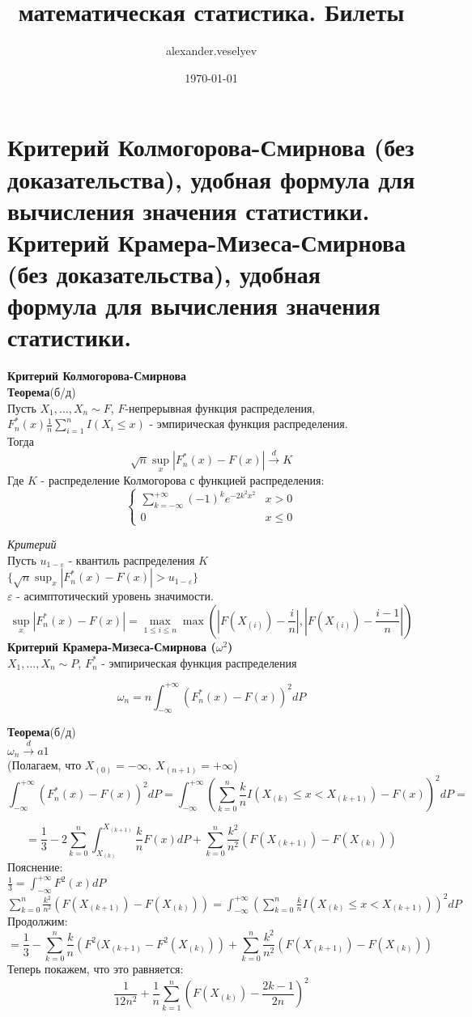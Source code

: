 \documentclass{article}
\title{математическая статистика. Билеты}
\author{alexander.veselyev }
\date{\today}
\begin{document}
\section{Критерий Колмогорова-Смирнова (без доказательства), удобная формула для вычисления значения статистики. Критерий Крамера-Мизеса-Смирнова (без доказательства), удобная формула для вычисления значения статистики.}

\textbf{Критерий Колмогорова-Смирнова}\\
\textbf{Теорема}(б/д)\\
Пусть $X_1,\dots,X_n\sim F$, $F$-непрерывная функция распределения,\\
$F_n^*(x)\frac{1}{n}\sum_{i=1}^nI(X_i\leq x)$ - эмпирическая функция распределения.\\
Тогда
$$ \sqrt{n}\sup_x|F_n^*(x) - F(x)|\xrightarrow{d}K $$
Где $K$ - распределение Колмогорова с функцией распределения:
\begin{equation*}
	\begin{cases}
		\sum_{k=-\infty}^{+\infty}{(-1)^ke^{-2k^2x^2}}&x>0\\
		0&x\leq0
	\end{cases}
\end{equation*}

\textit{Критерий}\\
Пусть $u_{1-\varepsilon}$ - квантиль распределения $K$\\
$\{\sqrt{n}\sup_x|F_n^*(x) - F(x)| > u_{1-\varepsilon}\}$\\
$\varepsilon$ - асимптотический уровень значимости.\\
$$ \sup_x|F_n^*(x) - F(x)| = \max_{1\leq i\leq n}\max(|F(X_{(i)}) - \frac{i}{n}|, |F(X_{(i)}) - \frac{i-1}{n}|) $$
\textbf{Критерий Крамера-Мизеса-Смирнова ($\omega^2$)}\\
$X_1,\dots,X_n\sim P$, $F_n^*$ - эмпирическая функция распределения

$$\omega_n = n\int_{-\infty}^{+\infty}{(F_n^*(x) - F(x))^2dP} $$

\textbf{Теорема}(б/д)\\
$\omega_n\xrightarrow{d}a1$\\
(Полагаем, что $X_{(0)} = -\infty,\ X_{(n+1)}= +\infty$)\\
$$\int_{-\infty}^{+\infty}{(F_n^*(x) - F(x))^2dP} = \int_{-\infty}^{+\infty}{\left(\sum_{k=0}^n{\frac{k}{n}I(X_{(k)}\leq x < X_{(k+1)})} - F(x)\right)^2dP} = $$

$$ = \frac{1}{3} - 2\sum_{k=0}^n{\int_{X_{(k)}}^{X_{(k+1)}} \frac{k}{n} F(x)dP  }  + \sum_{k=0}^n{ \frac{k^2}{n^2} \left(  F(X_{(k+1)}) - F(X_{(k)}) \right) }$$
Пояснение:\\
$\frac{1}{3} = \int_{-\infty}^{+\infty}{F^2(x)dP}$\\
$\sum_{k=0}^n{ \frac{k^2}{n^2} \left(  F(X_{(k+1)}) - F(X_{(k)}) \right) } =  \int_{-\infty}^{+\infty}{\left(\sum_{k=0}^n{\frac{k}{n}I(X_{(k)}\leq x < X_{(k+1)})}\right)^2dP}$\\
Продолжим:
$$ = \frac{1}{3} - \sum_{k=0}^n{\frac{k}{n}\left(F^2(X_{(k+1)} - F^2(X_{(k)})  \right)}  + \sum_{k=0}^n{ \frac{k^2}{n^2} \left(  F(X_{(k+1)}) - F(X_{(k)}) \right) }   $$
Теперь покажем, что это равняется:
$$ \frac{1}{12n^2} + \frac{1}{n}\sum_{k=1}^n{\left(F(X_{(k)}) - \frac{2k-1}{2n}  \right)^2}$$
\end{document}
